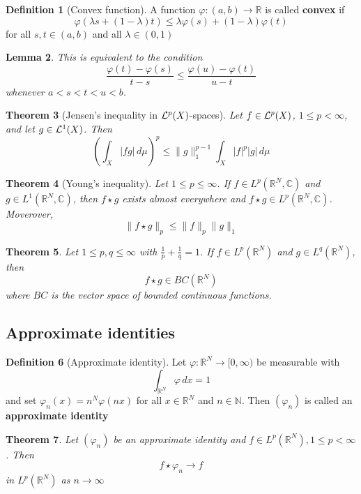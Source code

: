 \documentclass[10pt, oneside, reqno]{amsart}
\theoremstyle{plain}%
\newtheorem{thm}{Theorem}[section]
\newtheorem{lem}[thm]{Lemma}
\theoremstyle{definition}
\newtheorem{defn}[thm]{Definition}
\theoremstyle{remark}
\newcommand{\R}{\mathbb{R}}
\newcommand{\C}{\mathbb{C}}
\newcommand{\dmu}{\, d \mu}
\renewcommand{\phi}{\varphi}
\begin{document}
\begin{defn}[Convex function]
	A function $\phi : (a,b) \rightarrow \R$ is called \textbf{convex} if \[
		\phi(\lambda s + (1-\lambda)t) \leq \lambda \phi(s) + (1-\lambda) \phi(t)
	\] for all $s,t \in (a,b)$ and all $\lambda \in (0,1)$
\end{defn}

\begin{lem}
	This is equivalent to the condition\[
		\frac{\phi(t) - \phi(s)}{t-s} \leq \frac{\phi(u) - \phi(t)}{u - t}
	\] whenever $a < s < t < u < b$.
\end{lem}

\begin{thm}[Jensen's inequality in $\mathcal{L}^{p}(X)$-spaces]
	Let $f \in \mathcal{L}^{p}(X)$, $1\leq p < \infty$, and let $g \in \mathcal{L}^{1}(X)$.  Then \[
		\left(\int_X |fg| \dmu \right)^p \leq \|g\|^{p-1}_1 \int_X |f|^p |g| \dmu
	\]
\end{thm}

\begin{thm}[Young's inequality]
	Let $1 \leq p \leq \infty$.  If $f \in L^p(\R^N, \C)$ and $g \in L^1(\R^N, \C)$, then $f \star g$ exists almost everywhere and $f \star g \in L^p(\R^N, \C)$.  Moverover, \[
		\|f \star g \|_p \leq \|f\|_p \|g \|_1
	\]
\end{thm}

\begin{thm}
	Let $1 \leq p, q \leq \infty$ with $\frac{1}{p} + \frac{1}{q} = 1$.  If $f \in L^p(\R^N)$ and $g \in L^q(\R^N)$, then \[
		f \star g \in BC(\R^N)
	\] where $BC$ is the vector space of bounded continuous functions.
\end{thm}


\subsection{Approximate identities} %
\label{sub:approximate_identities}

\begin{defn}[Approximate identity]
	Let $\phi: \R^N \rightarrow [0,\infty)$ be measurable with \[
		\int_{\R^N} \phi \, dx = 1
	\] and set $\phi_n(x) = n^N \phi(n x)$ for all $x \in \R^N$ and $n \in \mathbb{N}$.  Then $(\phi_n)$ is called an \textbf{approximate identity}
\end{defn}

\begin{thm}
	Let $(\phi_n)$ be an approximate identity and $f \in L^p(\R^N), 1 \leq p < \infty$.  Then \[
		f \star \phi_n \rightarrow f
	\] in $L^p(\R^N)$ as $n \rightarrow \infty$
\end{thm}
\end{document}
